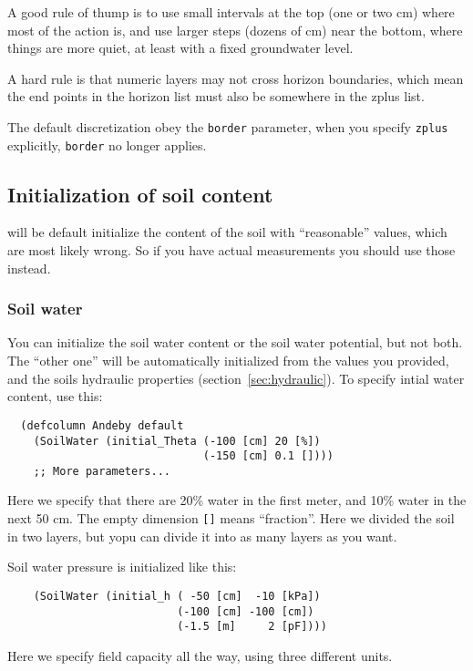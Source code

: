 \documentclass[a4paper,11pt]{article}
\begin{document}
A good rule of thump is to use small intervals at the top (one or two
cm) where most of the action is, and use larger steps (dozens of cm)
near the bottom, where things are more quiet, at least with a fixed
groundwater level.

A hard rule is that numeric layers may not cross horizon boundaries,
which mean the end points in the horizon list must also be somewhere
in the zplus list.

The default discretization obey the \texttt{border} parameter, when
you specify \texttt{zplus} explicitly, \texttt{border} no longer
applies.

\subsection{Initialization of soil content}
\label{sec:init}

\Daisy{} will be default initialize the content of the soil with
``reasonable'' values, which are most likely wrong.  So if you have
actual measurements you should use those instead.  

\subsubsection{Soil water}

You can initialize the soil water content or the soil water potential,
but not both.  The ``other one'' will be automatically initialized
from the values you provided, and the soils hydraulic properties
(section~\ref{sec:hydraulic}).  To specify intial water content, use
this: 
\begin{verbatim}
  (defcolumn Andeby default
    (SoilWater (initial_Theta (-100 [cm] 20 [%])
                              (-150 [cm] 0.1 [])))
    ;; More parameters...
\end{verbatim}
Here we specify that there are 20\% water in the first meter, and
10\% water in the next 50 cm.  The empty dimension \verb|[]| means
``fraction''.  Here we divided the soil in two layers, but yopu can
divide it into as many layers as you want.  

Soil water pressure is initialized like this:
\begin{verbatim}
    (SoilWater (initial_h ( -50 [cm]  -10 [kPa])
                          (-100 [cm] -100 [cm])
                          (-1.5 [m]     2 [pF])))
\end{verbatim}
Here we specify field capacity all the way, using three different
units. 
\end{document}
